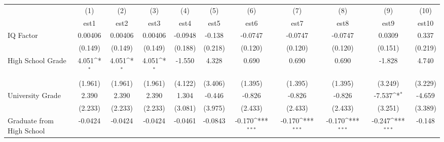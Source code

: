 {
\def\sym#1{\ifmmode^{#1}\else\(^{#1}\)\fi}
\begin{tabular}{l*{10}{c}}
\toprule
            &\multicolumn{1}{c}{(1)}&\multicolumn{1}{c}{(2)}&\multicolumn{1}{c}{(3)}&\multicolumn{1}{c}{(4)}&\multicolumn{1}{c}{(5)}&\multicolumn{1}{c}{(6)}&\multicolumn{1}{c}{(7)}&\multicolumn{1}{c}{(8)}&\multicolumn{1}{c}{(9)}&\multicolumn{1}{c}{(10)}\\
            &\multicolumn{1}{c}{est1}&\multicolumn{1}{c}{est2}&\multicolumn{1}{c}{est3}&\multicolumn{1}{c}{est4}&\multicolumn{1}{c}{est5}&\multicolumn{1}{c}{est6}&\multicolumn{1}{c}{est7}&\multicolumn{1}{c}{est8}&\multicolumn{1}{c}{est9}&\multicolumn{1}{c}{est10}\\
\midrule
IQ Factor   &     0.00406         &     0.00406         &     0.00406         &     -0.0948         &      -0.138         &     -0.0747         &     -0.0747         &     -0.0747         &      0.0309         &       0.337         \\
            &     (0.149)         &     (0.149)         &     (0.149)         &     (0.188)         &     (0.218)         &     (0.120)         &     (0.120)         &     (0.120)         &     (0.151)         &     (0.219)         \\
\addlinespace
High School Grade&       4.051\sym{*}  &       4.051\sym{*}  &       4.051\sym{*}  &      -1.550         &       4.328         &       0.690         &       0.690         &       0.690         &      -1.828         &       4.740         \\
            &     (1.961)         &     (1.961)         &     (1.961)         &     (4.122)         &     (3.406)         &     (1.395)         &     (1.395)         &     (1.395)         &     (3.249)         &     (3.229)         \\
\addlinespace
University Grade&       2.390         &       2.390         &       2.390         &       1.304         &      -0.446         &      -0.826         &      -0.826         &      -0.826         &      -7.537\sym{*}  &      -4.659         \\
            &     (2.233)         &     (2.233)         &     (2.233)         &     (3.081)         &     (3.975)         &     (2.433)         &     (2.433)         &     (2.433)         &     (3.251)         &     (3.389)         \\
\addlinespace
Graduate from High School&     -0.0424         &     -0.0424         &     -0.0424         &     -0.0461         &     -0.0843         &      -0.170\sym{***}&      -0.170\sym{***}&      -0.170\sym{***}&      -0.247\sym{***}&      -0.148         \\

\end{tabular}}

